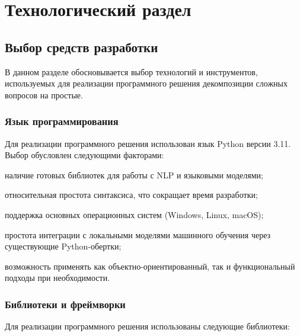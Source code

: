 \chapter{Технологический раздел}

\section{Выбор средств разработки}

В данном разделе обосновывается выбор технологий и инструментов, используемых для реализации программного решения декомпозиции сложных вопросов на простые.

\subsection{Язык программирования}

Для реализации программного решения использован язык Python версии 3.11. Выбор обусловлен следующими факторами:

\begin{enumdescript}
	\item наличие готовых библиотек для работы с NLP и языковыми моделями;
	\item относительная простота синтаксиса, что сокращает время разработки;
	\item поддержка основных операционных систем (Windows, Linux, macOS);
	\item простота интеграции с локальными моделями машинного обучения через существующие Python-обертки;
	\item возможность применять как объектно-ориентированный, так и функциональный подходы при необходимости.
\end{enumdescript}

\subsection{Библиотеки и фреймворки}

Для реализации программного решения использованы следующие библиотеки:

